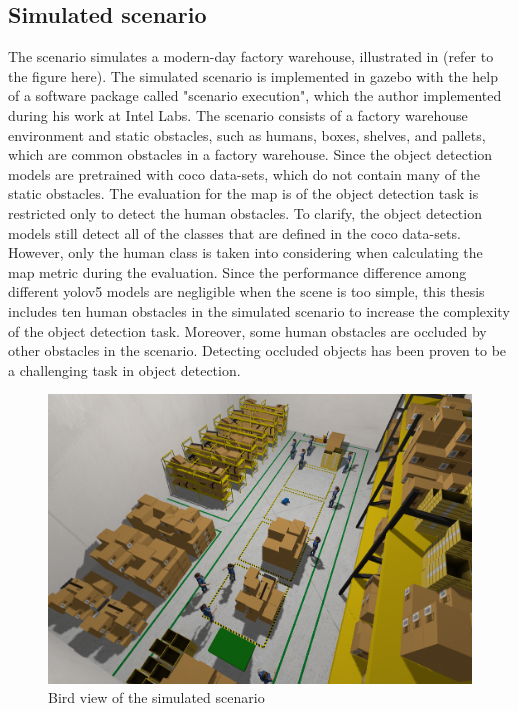 \subsection{Simulated scenario}

The scenario simulates a modern-day factory warehouse, illustrated in (refer to the figure here). The simulated scenario is implemented in \gls{gazebo} with the help of a software package called "scenario execution", which the author implemented during his work at Intel Labs. The scenario consists of a factory warehouse environment and static obstacles, such as humans, boxes, shelves, and pallets, which are common obstacles in a factory warehouse. Since the object detection models are pretrained with \gls{coco} data-sets, which do not contain many of the static obstacles. The evaluation for the \gls{map} is of the object detection task is restricted only to detect the human obstacles. To clarify, the object detection models still detect all of the classes that are defined in the \gls{coco} data-sets. However, only the human class is taken into considering when calculating the \gls{map} metric during the evaluation. Since the performance difference among different \gls{yolov5} models are negligible when the scene is too simple, this thesis includes ten human obstacles in the simulated scenario to increase the complexity of the object detection task. Moreover, some human obstacles are occluded by other obstacles in the scenario. Detecting occluded objects has been proven to be a challenging task in object detection. 

\begin{figure}
    \centering
    \includegraphics[width=120mm]{figures/sim/bird_view.png}
    \caption{Bird view of the simulated scenario}
    \label{fig:bird_view_scenario}
\end{figure}

